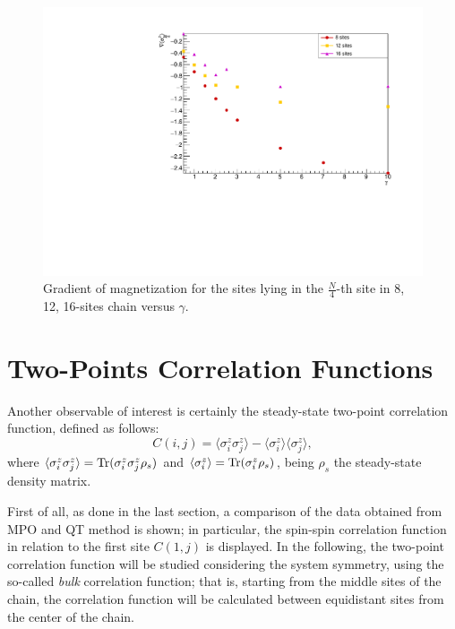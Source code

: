 \begin{figure}[H]
    \centering
    \includegraphics[scale=0.7]{Figures/gradLMvsGammavsSize_firstQuarterChain.pdf}
    \caption{Gradient of magnetization for the sites lying in the $\frac{N}{4}$-th site in 8, 12, 16-sites chain versus $\gamma$.}
    \label{fig:gradLMvsGammavsSize_firstQuarterChain}
\end{figure}

\section{Two-Points Correlation Functions}
Another observable of interest is certainly the steady-state two-point correlation function, defined as follows:
\begin{equation}
    C(i, j) = \langle \sigma^z_i \sigma^z_j \rangle - \langle \sigma^z_i \rangle \langle \sigma^z_j \rangle,
\end{equation}
where $\langle \sigma^z_i \sigma^z_j \rangle = \operatorname{Tr}(\sigma^z_i \sigma^z_j \rho_{s})$ and $\langle \sigma^z_i \rangle = \operatorname{Tr}(\sigma^z_i \rho_{s})$, being $\rho_{s}$ the steady-state density matrix.

First of all, as done in the last section, a comparison of the data obtained from MPO and QT method is shown; in particular, the spin-spin correlation function in relation to the first site $C(1, j)$ is displayed. In the following, the two-point correlation function will be studied considering the system symmetry, using the so-called \emph{bulk} correlation function; that is, starting from the middle sites of the chain, the correlation function will be calculated between equidistant sites from the center of the chain. 

